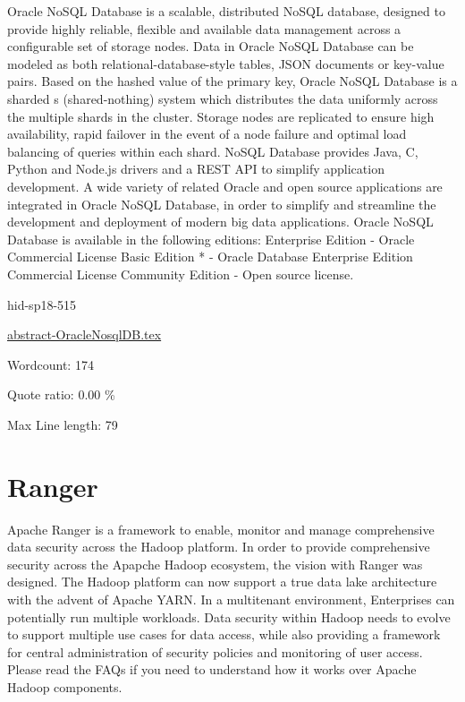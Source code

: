Oracle NoSQL Database\cite{hid-sp18-515-www-oraclenosql} is a scalable, 
distributed NoSQL database, designed to provide highly reliable, flexible 
and available data management across a configurable set of storage nodes.
Data in Oracle NoSQL Database can be modeled as both relational-database-style 
tables, JSON documents or key-value pairs.
Based on the hashed value of the primary key, Oracle NoSQL Database is 
a sharded s (shared-nothing) system which distributes the data uniformly 
across the multiple shards in the cluster.
Storage nodes are replicated to ensure high availability, rapid failover 
in the event of a node failure and optimal load balancing of queries
within each shard. 
NoSQL Database provides Java, C, Python and Node.js drivers and a 
REST API to simplify application development.
A wide variety of related Oracle and open source applications are 
integrated in Oracle NoSQL Database, in order to simplify and streamline 
the development and deployment of modern big data applications.
Oracle NoSQL Database is available in the following editions: 
Enterprise Edition - Oracle Commercial License
Basic Edition * - Oracle Database Enterprise Edition Commercial 
License
Community Edition - Open source license.


\begin{IU}

hid-sp18-515

\href{https://github.com/cloudmesh-community/hid-sp18-515/blob/master//technology/abstract-OracleNosqlDB.tex}{abstract-OracleNosqlDB.tex}

 

Wordcount: 174


Quote ratio: 0.00 \%
 
Max Line length: 79
\end{IU}

\section{Ranger}

Apache Ranger\cite{hid-sp18-515-www-ranger} is a framework to enable, 
monitor and manage comprehensive data security across the Hadoop 
platform.
In order to provide comprehensive security across the Apapche Hadoop 
ecosystem, the vision with Ranger was designed.
The Hadoop platform can now support a true data lake architecture with
the advent of Apache YARN.
In a multitenant environment, Enterprises can potentially run multiple 
workloads.
Data security within Hadoop needs to evolve to support multiple use cases 
for data access, while also providing a framework for central 
administration of security policies and monitoring of user access.
Please read the FAQs if you need to understand how it works over 
Apache Hadoop components.


